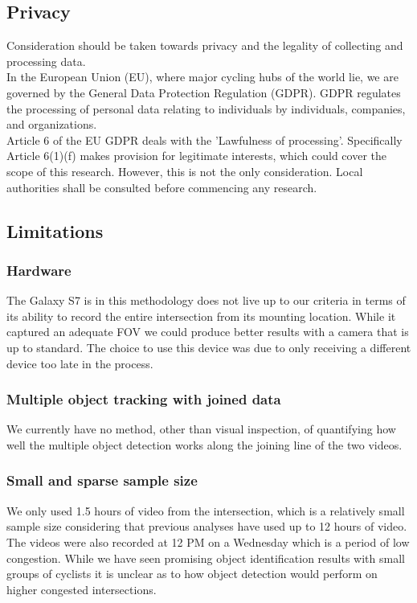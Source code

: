 \subsection{Privacy}

Consideration should be taken towards privacy and the legality of collecting and processing data.
\ \\

In the European Union (EU), where major cycling hubs of the world lie, we are governed by the General Data Protection Regulation (GDPR). GDPR regulates the processing of personal data 
relating to individuals by individuals, companies, and organizations.
\ \\

Article 6 of the EU GDPR deals with the 'Lawfulness of processing'. Specifically Article 6(1)(f)
makes provision for legitimate interests, which could cover the scope of this research.
However, this is not the only consideration. Local authorities shall be consulted before commencing any research.
\ \\

\subsection{Limitations}
\subsubsection{Hardware}
The Galaxy S7 is in this methodology does not live up to our criteria in terms of its 
ability to record the entire intersection from its mounting location. While it captured an adequate 
FOV we could produce better results with a camera that is up to standard. The choice to use this device 
was due to only receiving a different device too late in the process.
\ \\

\subsubsection{Multiple object tracking with joined data}
We currently have no method, other than visual inspection, of quantifying how well the multiple object 
detection works along the joining line of the two videos.
\ \\

\subsubsection{Small and sparse sample size}
We only used 1.5 hours of video from the intersection, which is a relatively small sample size considering
that previous analyses have used up to 12 hours of video. The videos were also recorded at 12 PM on a Wednesday 
which is a period of low congestion. While we have seen promising object identification results with small groups
of cyclists it is unclear as to how object detection would perform on higher congested intersections. 
\ \\

